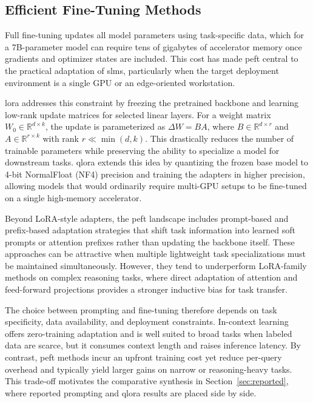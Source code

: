 \subsection{Efficient Fine-Tuning Methods}
\label{subsec:background_efficient_finetuning}
Full fine-tuning updates all model parameters using task-specific data, which for a 7B-parameter model can require tens of gigabytes of accelerator memory once gradients and optimizer states are included. This cost has made \gls{peft} central to the practical adaptation of \glspl{slm}, particularly when the target deployment environment is a single GPU or an edge-oriented workstation.

\gls{lora} \citep{hu2022lora} addresses this constraint by freezing the pretrained backbone and learning low-rank update matrices for selected linear layers. For a weight matrix $W_0 \in \mathbb{R}^{d \times k}$, the update is parameterized as $\Delta W = BA$, where $B \in \mathbb{R}^{d \times r}$ and $A \in \mathbb{R}^{r \times k}$ with rank $r \ll \min(d,k)$. This drastically reduces the number of trainable parameters while preserving the ability to specialize a model for downstream tasks. \gls{qlora} \citep{dettmers2023qlora} extends this idea by quantizing the frozen base model to 4-bit NormalFloat (NF4) precision and training the adapters in higher precision, allowing models that would ordinarily require multi-GPU setups to be fine-tuned on a single high-memory accelerator.

Beyond LoRA-style adapters, the \gls{peft} landscape includes prompt-based and prefix-based adaptation strategies that shift task information into learned soft prompts or attention prefixes rather than updating the backbone itself. These approaches can be attractive when multiple lightweight task specializations must be maintained simultaneously. However, they tend to underperform LoRA-family methods on complex reasoning tasks, where direct adaptation of attention and feed-forward projections provides a stronger inductive bias for task transfer.

The choice between prompting and fine-tuning therefore depends on task specificity, data availability, and deployment constraints. In-context learning offers zero-training adaptation and is well suited to broad tasks when labeled data are scarce, but it consumes context length and raises inference latency. By contrast, \gls{peft} methods incur an upfront training cost yet reduce per-query overhead and typically yield larger gains on narrow or reasoning-heavy tasks. This trade-off motivates the comparative synthesis in Section~\ref{sec:reported}, where reported prompting and \gls{qlora} results are placed side by side.


